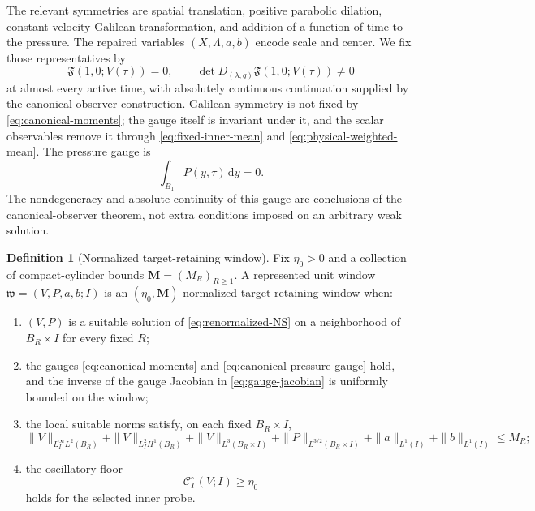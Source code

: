 \documentclass[11pt]{amsart}
\numberwithin{equation}{section}
\theoremstyle{plain}
\theoremstyle{definition}
\newtheorem{definition}[definition]{Definition}
\theoremstyle{remark}
\newcommand{\dd}{\,\mathrm d}
\newcommand{\OscMass}{\mathcal C^{\circ}}
\begin{document}
The relevant symmetries are spatial translation, positive parabolic dilation,
constant-velocity Galilean transformation, and addition of a function of time
to the pressure.  The repaired variables \((X,\Lambda,a,b)\) encode scale and
center.  We fix those representatives by
\begin{equation}\label{eq:canonical-moments}
 \mathfrak F(1,0;V(\tau))=0,
 \qquad
 \det D_{(\lambda,q)}\mathfrak F(1,0;V(\tau))\ne0
\end{equation}
at almost every active time, with absolutely continuous continuation supplied
by the canonical-observer construction.  Galilean symmetry is not fixed by
\eqref{eq:canonical-moments}; the gauge itself is invariant under it, and the
scalar observables remove it through \eqref{eq:fixed-inner-mean} and
\eqref{eq:physical-weighted-mean}.
The pressure gauge is
\begin{equation}\label{eq:canonical-pressure-gauge}
 \int_{B_1}P(y,\tau)\dd y=0.
\end{equation}
The nondegeneracy and absolute continuity of this gauge are conclusions of the
canonical-observer theorem, not extra conditions imposed on an arbitrary weak
solution.

\begin{definition}[Normalized target-retaining window]
\label{def:normalized-target-window}
Fix \(\eta_0>0\) and a collection of compact-cylinder bounds
\(\mathbf M=(M_R)_{R\ge1}\).  A represented unit window
\(\mathfrak w=(V,P,a,b;I)\) is an
\((\eta_0,\mathbf M)\)-normalized target-retaining window when:
\begin{enumerate}[label=\textup{(\roman*)},leftmargin=2.2em]
\item \((V,P)\) is a suitable solution of \eqref{eq:renormalized-NS} on a
neighborhood of \(B_R\times I\) for every fixed \(R\);
\item the gauges \eqref{eq:canonical-moments} and
\eqref{eq:canonical-pressure-gauge} hold, and the inverse of the gauge
Jacobian in \eqref{eq:gauge-jacobian} is uniformly bounded on the window;
\item the local suitable norms satisfy, on each fixed \(B_R\times I\),
\begin{equation}\label{eq:target-window-bounds}
 \|V\|_{L^\infty_I L^2(B_R)}
 +\|V\|_{L^2_I H^1(B_R)}
 +\|V\|_{L^3(B_R\times I)}
 +\|P\|_{L^{3/2}(B_R\times I)}
 +\|a\|_{L^1(I)}+\|b\|_{L^1(I)}
 \le M_R;
\end{equation}
\item the oscillatory floor
\begin{equation}\label{eq:target-window-floor}
 \OscMass_\Gamma(V;I)\ge\eta_0
\end{equation}
holds for the selected inner probe.
\end{enumerate}
\end{definition}
\end{document}
